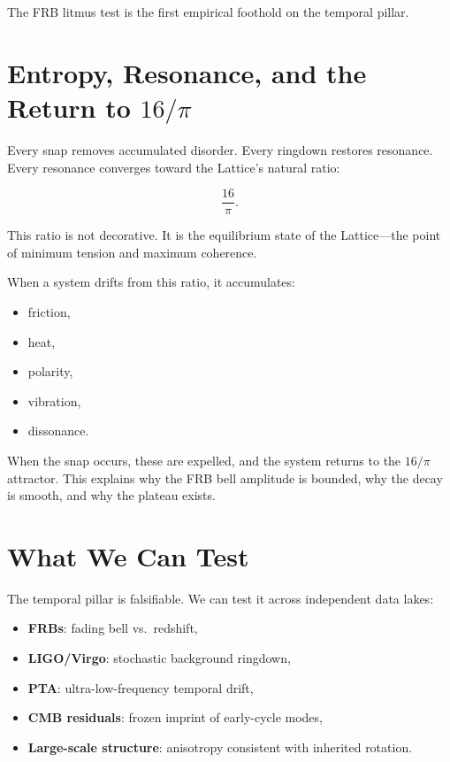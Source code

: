 \documentclass[11pt, letterpaper, openany]{book}
\begin{document}
The FRB litmus test is the first empirical foothold on the temporal
pillar.

\section{Entropy, Resonance, and the Return to \texorpdfstring{$16/\pi$}{16/pi}}

Every snap removes accumulated disorder.  
Every ringdown restores resonance.  
Every resonance converges toward the Lattice's natural ratio:

\[
\frac{16}{\pi}.
\]

This ratio is not decorative. It is the equilibrium state of the
Lattice---the point of minimum tension and maximum coherence.

When a system drifts from this ratio, it accumulates:

\begin{itemize}
    \item friction,
    \item heat,
    \item polarity,
    \item vibration,
    \item dissonance.
\end{itemize}

When the snap occurs, these are expelled, and the system returns to the
$16/\pi$ attractor. This explains why the FRB bell amplitude is bounded,
why the decay is smooth, and why the plateau exists.

\section{What We Can Test}

The temporal pillar is falsifiable.  
We can test it across independent data lakes:

\begin{itemize}
    \item \textbf{FRBs}: fading bell vs.\ redshift,
    \item \textbf{LIGO/Virgo}: stochastic background ringdown,
    \item \textbf{PTA}: ultra-low-frequency temporal drift,
    \item \textbf{CMB residuals}: frozen imprint of early-cycle modes,
    \item \textbf{Large-scale structure}: anisotropy consistent with inherited rotation.
\end{itemize}
\end{document}
